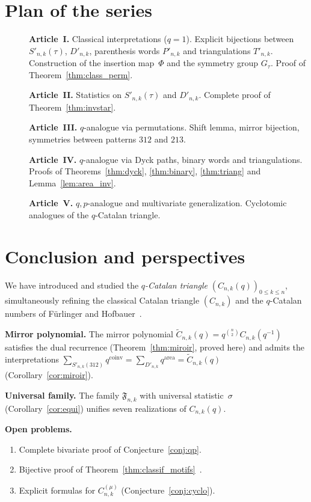 \documentclass[12pt,a4paper,reqno]{amsart}
\theoremstyle{plain}
\theoremstyle{definition}
\newcommand{\Coinv}{\mathrm{coinv}}
\newcommand{\Area}{\mathrm{area}}
\newcommand{\Snkp}[1]{S'_{n,k}(#1)}
\newcommand{\Dnk}{D'_{n,k}}
\newcommand{\Ctilde}{\widetilde{C}}
\begin{document}
\section{Plan of the series}\label{sec:plan}
\begin{description}
\item[\cite{W1}] \textbf{Article~I.} Classical interpretations ($q=1$).
Explicit bijections between $\Snkp{\tau}$, $\Dnk$,
parenthesis words $P'_{n,k}$ and triangulations $T'_{n,k}$.
Construction of the insertion map~$\Phi$ and the symmetry group $G_\tau$.
Proof of Theorem~\ref{thm:class_perm}.
\item[\cite{W2}] \textbf{Article~II.} Statistics on $\Snkp{\tau}$ and $\Dnk$.
Complete proof of Theorem~\ref{thm:invstar}.
\item[\cite{W3}] \textbf{Article~III.} $q$-analogue via permutations.
Shift lemma, mirror bijection, symmetries between patterns $312$ and $213$.
\item[\cite{W4}] \textbf{Article~IV.} $q$-analogue via Dyck paths, binary words
and triangulations. Proofs of Theorems~\ref{thm:dyck}, \ref{thm:binary},
\ref{thm:triang} and Lemma~\ref{lem:area_inv}.
\item[\cite{W5}] \textbf{Article~V.} $q{,}p$-analogue and multivariate generalization.
Cyclotomic analogues of the $q$-Catalan triangle.
\end{description}

\section{Conclusion and perspectives}\label{sec:conclusion}
We have introduced and studied the \emph{$q$-Catalan triangle}
$(C_{n,k}(q))_{0\le k\le n}$, simultaneously refining the classical
Catalan triangle $(C_{n,k})$ and the $q$-Catalan numbers of
F\"urlinger and Hofbauer~\cite{FH}.

\medskip\noindent\textbf{Mirror polynomial.}
The mirror polynomial $\Ctilde_{n,k}(q)=q^{\binom{n}{2}}C_{n,k}(q^{-1})$
satisfies the dual recurrence (Theorem~\ref{thm:miroir}, proved here)
and admits the interpretations
$\sum_{\Snkp{312}}q^{\Coinv}=\sum_{\Dnk}q^{\Area}=\Ctilde_{n,k}(q)$
(Corollary~\ref{cor:miroir}).

\medskip\noindent\textbf{Universal family.}
The family $\mathfrak{F}_{n,k}$ with universal statistic~$\sigma$
(Corollary~\ref{cor:equi}) unifies seven realizations of $C_{n,k}(q)$.

\medskip\noindent\textbf{Open problems.}
\begin{enumerate}
\item Complete bivariate proof of Conjecture~\ref{conj:qp}.
\item Bijective proof of Theorem~\ref{thm:classif_motifs}~\cite{W3}.
\item Explicit formulas for $C_{n,k}^{(\mu)}$ (Conjecture~\ref{conj:cyclo}).
\end{enumerate}
\end{document}
